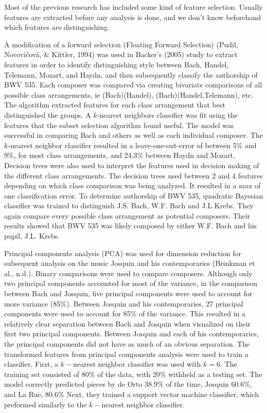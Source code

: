 \documentclass[12pt,twoside]{reedthesis}
\theoremstyle{definition}
\theoremstyle{definition}
\theoremstyle{definition}
\theoremstyle{remark}
\begin{document}
Most of the previous research has included some kind of feature
selection. Usually features are extracted before any analysis is done,
and we don't know beforehand which features are distinguishing.

A modification of a forward selection (Floating Forward Selection)
(Pudil, Novovičová, \& Kittler, 1994) was used in Backer's (2005) study
to extract features in order to identify distinguishing style between
Bach, Handel, Telemann, Mozart, and Haydn, and then subsequently
classify the authorship of BWV 535. Each composer was compared via
creating bivariate comparisons of all possible class arrangements, ie
(Bach)(Handel), (Bach)(Handel,Telemann), etc. The algorithm extracted
features for each class arrangement that best distinguished the groups.
A \(k\)-nearest neighbors classifier was fit using the features that the
subset selection algorithm found useful. The model was successful in
comparing Bach and others as well as each individual composer. The
\(k\)-nearest neighbor classifier resulted in a leave-one-out-error of
between 5\% and 9\%, for most class arrangements, and 24.3\% between
Haydn and Mozart, Decision trees were also used to interpret the
features used in decision making of the different class arrangements.
The decision trees used between 2 and 4 features depending on which
class comparison was being analyzed. It resulted in a max of one
classification error. To determine authorship of BWV 535, quadratic
Bayesian classifier was trained to distinguish J.S. Bach, W.F. Bach and
J.L Krebs. They again compare every possible class arrangement as
potential composers. Their results showed that BWV 535 was likely
composed by either W.F. Bach and his pupil, J.L. Krebs.

Principal components analysis (PCA) was used for dimension reduction for
subsequent analysis on the music Josquin and his contemporaries
(Brinkman et al., n.d.). Binary comparisons were used to compare
composers. Although only two principal components accounted for most of
the variance, in the comparison between Bach and Josquin, five principal
components were used to account for more variance (85\%). Between
Josquin and his contemporaries, 27 principal components were used to
account for 85\% of the variance. This resulted in a relatively clear
separation between Bach and Josquin when visualized on their first two
principal components. Between Josquin and each of his contemporaries,
the principal components did not have as much of an obvious separation.
The transformed features from principal components analysis were used to
train a classifier. First, a \(k-\)nearest neighbor classifier was used
with \(k = 6\). The training set consisted of 80\% of the data, with
20\% withheld as a testing set. The model correctly predicted pieces by
de Orto 38.9\% of the time, Josquin 60.6\%, and La Rue, 80.6\% Next,
they trained a support vector machine classifier, which preformed
similarly to the \(k-\)nearest neighbor classifier.
\end{document}

